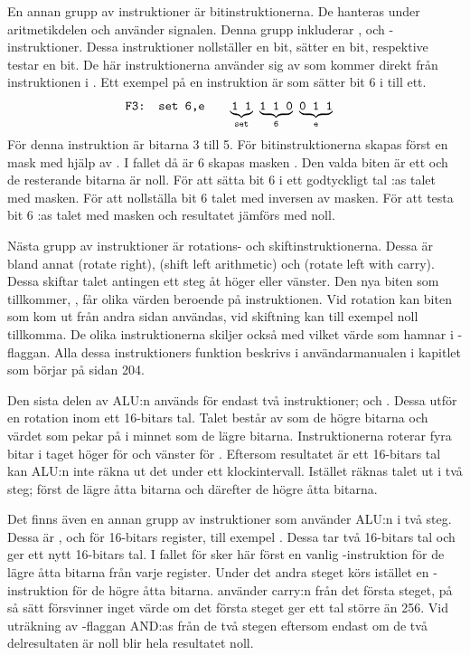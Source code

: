 \documentclass[main.tex]{subfiles}
\begin{document}
En annan grupp av instruktioner är bitinstruktionerna. De hanteras under
aritmetikdelen och använder  signalen. Denna grupp inkluderar
,  och -instruktioner. Dessa instruktioner
nollställer en bit, sätter en bit, respektive testar en bit. De här
instruktionerna använder sig av  som kommer direkt från
instruktionen i . Ett exempel på en instruktion är  som
sätter bit 6 i  till ett.
\begin{align*}
    &\texttt{F3: set 6,e}& \quad &
    {\underbrace{\texttt{1 1}}_{\texttt{set}}}\texttt{ }
    {\underbrace{\texttt{1 1 0}}_{\texttt{6}}}\texttt{ }
    {\underbrace{\texttt{0 1 1}}_{\texttt{e}}}
\end{align*}
För denna instruktion är  bitarna 3 till 5. För
bitinstruktionerna skapas först en mask med hjälp av . I
fallet då  är 6 skapas masken . Den valda
biten är ett och de resterande bitarna är noll. För att sätta bit 6 i ett
godtyckligt tal :as talet med masken. För att nollställa bit 6
 talet med inversen av masken. För att testa bit 6 :as
talet med masken och resultatet jämförs med noll.

Nästa grupp av instruktioner är rotations- och skiftinstruktionerna. Dessa är
bland annat  (rotate right),  (shift left arithmetic) och
 (rotate left with carry). Dessa skiftar talet antingen ett steg åt
höger eller vänster. Den nya biten som tillkommer, , får olika
värden beroende på instruktionen. Vid rotation kan biten som kom ut från andra
sidan användas, vid skiftning kan till exempel noll tillkomma. De olika
instruktionerna skiljer också med vilket värde som hamnar i -flaggan.
Alla dessa instruktioners funktion beskrivs i användarmanualen\cite{z80um} i
kapitlet som börjar på sidan 204.

Den sista delen av ALU:n används för endast två instruktioner;  och
. Dessa utför en rotation inom ett 16-bitars tal. Talet består av
 som de högre bitarna och värdet som  pekar på i minnet som de
lägre bitarna. Instruktionerna roterar fyra bitar i taget höger för 
och vänster för . Eftersom resultatet är ett 16-bitars tal kan ALU:n
inte räkna ut det under ett klockintervall. Istället räknas talet ut i två
steg; först de lägre åtta bitarna och därefter de högre åtta bitarna.

Det finns även en annan grupp av instruktioner som använder ALU:n i två steg.
Dessa är ,  och  för 16-bitars register, till
exempel . Dessa tar två 16-bitars tal och ger ett nytt
16-bitars tal. I fallet för  sker här först en vanlig
-instruktion för de lägre åtta bitarna från varje register. Under det
andra steget körs istället en -instruktion för de högre åtta bitarna.
 använder carry:n från det första steget, på så sätt försvinner inget
värde om det första steget ger ett tal större än 256. Vid uträkning av
-flaggan AND:as  från de två stegen eftersom endast om de två
delresultaten är noll blir hela resultatet noll.

\clearpage
\end{document}

